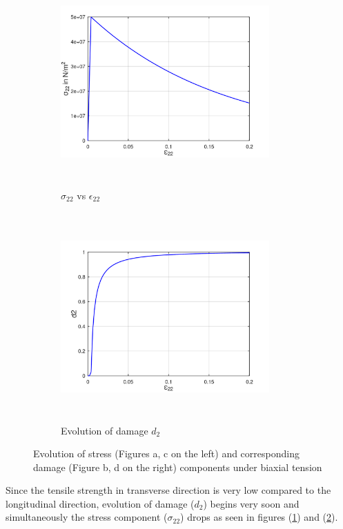 \documentclass[12pt,a4paper,twoside,openright]{report}
\begin{document}
\FloatBarrier
\begin{figure}[htbp!]\ContinuedFloat 
     \begin{subfigure}{0.4\textwidth}
         \includegraphics[width=8cm,height=8cm,keepaspectratio]{23.S22vsE22.png}
         \caption{$\sigma_{22}$ vs $\epsilon_{22}$}
         \label{fig:S22vsE22}
     \end{subfigure}
     \hspace{1.8cm}
     \begin{subfigure}{0.4\textwidth}
         \centering
         \includegraphics[width=8cm,height=8cm,keepaspectratio]{23.d2.png}
         \caption{Evolution of damage $d_{2}$}
         \label{fig:Evolution of damage d2}
     \end{subfigure}
    
        \caption{Evolution of stress (Figures a, c on the left) and corresponding damage (Figure b, d on the right) components under biaxial tension}
        \label{fig:Evolution of damage under biaxial tension}     
\end{figure} 
\FloatBarrier
Since the tensile strength in transverse direction is very low compared to the longitudinal direction, evolution of damage ($d_{2}$) begins very soon and simultaneously the stress component ($\sigma_{22}$) drops as seen in figures (\ref{fig:S22vsE22}) and (\ref{fig:Evolution of damage d2}).
\end{document}
